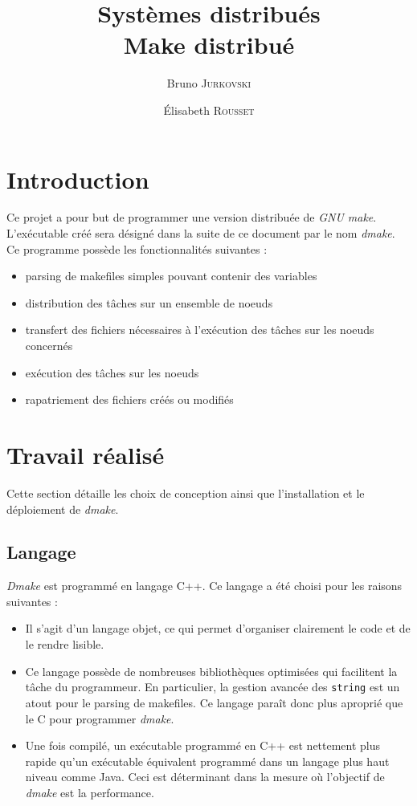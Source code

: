 \documentclass[a4paper,12pt,twoside]{article}
\title{Systèmes distribués\\
  Make distribué}
\author{Bruno \textsc{Jurkovski}\and Élisabeth \textsc{Rousset}}
\begin{document}
\maketitle
\newpage

\tableofcontents

\listoffigures

\newpage

\section*{Introduction}

Ce projet a pour but de programmer une version distribuée de \emph{GNU
  make}. L'exécutable créé sera désigné dans la suite de ce document
par le nom \emph{dmake}. Ce programme possède les fonctionnalités
suivantes :
\begin{itemize}
\item parsing de makefiles simples pouvant contenir des variables
\item distribution des tâches sur un ensemble de noeuds
\item transfert des fichiers nécessaires à l'exécution des tâches sur
  les noeuds concernés
\item exécution des tâches sur les noeuds
\item rapatriement des fichiers créés ou modifiés
\end{itemize}

\section{Travail réalisé}

Cette section détaille les choix de conception ainsi que
l'installation et le déploiement de \emph{dmake}.

\subsection{Langage}

\emph{Dmake} est programmé en langage C++. Ce langage a été choisi
pour les raisons suivantes :
\begin{itemize}
\item Il s'agit d'un langage objet, ce qui permet d'organiser
  clairement le code et de le rendre lisible.
\item Ce langage possède de nombreuses bibliothèques optimisées qui
  facilitent la tâche du programmeur. En particulier, la gestion
  avancée des \texttt{string} est un atout pour le parsing de
  makefiles. Ce langage paraît donc plus aproprié que le C pour
  programmer \emph{dmake}.
\item Une fois compilé, un exécutable programmé en C++ est nettement
  plus rapide qu'un exécutable équivalent programmé dans un langage
  plus haut niveau comme Java. Ceci est déterminant dans la mesure où
  l'objectif de \emph{dmake} est la performance.
\end{itemize}
\end{document}
